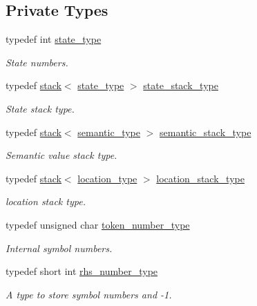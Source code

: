 \subsection*{Private Types}
\begin{DoxyCompactItemize}
\item 
typedef int \hyperlink{classyy_1_1_parser_implementation_aff695fe39c8a45b9036b85b9156276e8}{state\_\-type}
\begin{DoxyCompactList}\small\item\em State numbers. \end{DoxyCompactList}\item 
typedef \hyperlink{classyy_1_1stack}{stack}$<$ \hyperlink{classyy_1_1_parser_implementation_aff695fe39c8a45b9036b85b9156276e8}{state\_\-type} $>$ \hyperlink{classyy_1_1_parser_implementation_a73ef7b307555b32460fa788f1c4d334a}{state\_\-stack\_\-type}
\begin{DoxyCompactList}\small\item\em State stack type. \end{DoxyCompactList}\item 
typedef \hyperlink{classyy_1_1stack}{stack}$<$ \hyperlink{unionyy_1_1_parser_implementation_1_1semantic__type}{semantic\_\-type} $>$ \hyperlink{classyy_1_1_parser_implementation_ae4682cabaf647f24fab3e2a350732849}{semantic\_\-stack\_\-type}
\begin{DoxyCompactList}\small\item\em Semantic value stack type. \end{DoxyCompactList}\item 
typedef \hyperlink{classyy_1_1stack}{stack}$<$ \hyperlink{classyy_1_1location}{location\_\-type} $>$ \hyperlink{classyy_1_1_parser_implementation_ada3aecfd4e2e1bc7928ee6cd1c0d4b49}{location\_\-stack\_\-type}
\begin{DoxyCompactList}\small\item\em location stack type. \end{DoxyCompactList}\item 
typedef unsigned char \hyperlink{classyy_1_1_parser_implementation_a729ec5de6d4445eb556d2db42cbb4bde}{token\_\-number\_\-type}
\begin{DoxyCompactList}\small\item\em Internal symbol numbers. \end{DoxyCompactList}\item 
typedef short int \hyperlink{classyy_1_1_parser_implementation_a8560d05133a5d38235df7281ddf0a494}{rhs\_\-number\_\-type}
\begin{DoxyCompactList}\small\item\em A type to store symbol numbers and -\/1. \end{DoxyCompactList}\end{DoxyCompactItemize}
